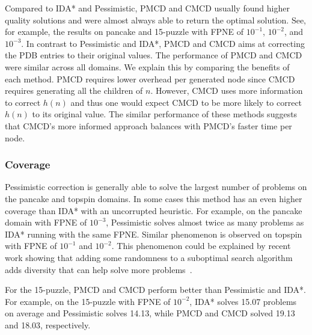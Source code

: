 \documentclass[letterpaper]{article}
\newcommand{\roni}[1]{\mbox{\tt RONI: #1}}
\begin{document}
Compared to IDA* and Pessimistic, PMCD and CMCD usually found higher quality solutions  and were almost always able to return the optimal solution. See, for example, the results on pancake and 15-puzzle with FPNE of $10^{-1}$, $10^{-2}$, and $10^{-3}$. %
In contrast to Pessimistic and IDA*, PMCD and CMCD aims at correcting the PDB entries to their original values. %
%
The performance of PMCD and CMCD were similar across all domains. We explain this by comparing the benefits of each method. PMCD requires lower overhead per generated node since CMCD requires generating all the children of $n$. However, CMCD uses more information to correct $h(n)$ and thus one would expect CMCD to be more likely to correct $h(n)$ to its original value. The similar performance of these methods suggests that CMCD's more informed approach balances with PMCD's faster time per node.

\subsubsection{Coverage}

Pessimistic correction is generally able to solve the largest number of problems on the pancake and topspin domains. In some cases this method has an even higher coverage than IDA* with an uncorrupted heuristic. For example, on the pancake domain with FPNE of $10^{-3}$, Pessimistic solves almost twice as many problems as IDA* running with the same FPNE. %
Similar phenomenon is observed on topspin with FPNE of $10^{-1}$ and $10^{-2}$. %
This phenomenon could be explained by recent work showing that adding some randomness to a suboptimal search algorithm adds diversity that can help solve more problems~\cite{valenzano2014comparison}. %

For the 15-puzzle, PMCD and CMCD perform better than Pessimistic and IDA*. For example, on the 15-puzzle with FPNE of $10^{-2}$, IDA* solves 15.07 problems on average and Pessimistic solves 14.13, while PMCD and CMCD solved 19.13 and 18.03, respectively. 
\end{document}
